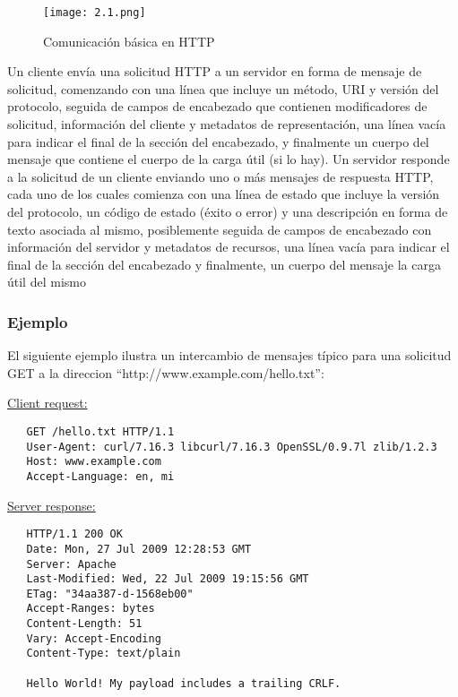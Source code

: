 \begin{center}
   \begin{figure}   
      \begin{center}
         \texttt{[image: 2.1.png]}
      \end{center}
      \caption{Comunicación básica en HTTP}
   \end{figure}
\end{center}

Un cliente envía una solicitud HTTP a un servidor en forma de mensaje
 de solicitud, comenzando con una línea que incluye un método, URI y 
 versión del protocolo, seguida de campos de encabezado que contienen
  modificadores de solicitud, información del cliente y metadatos de
   representación, una línea vacía para indicar el final de la sección
    del encabezado, y finalmente un cuerpo del mensaje que contiene el 
    cuerpo de la carga útil (si lo hay). Un servidor responde a la 
    solicitud de un cliente enviando uno o más mensajes de respuesta 
    HTTP, cada uno de los cuales comienza con una línea de estado que 
    incluye la versión del protocolo, un código de estado (éxito o error)
     y una descripción en forma de texto asociada al mismo, posiblemente 
     seguida de campos de encabezado con información del servidor y
      metadatos de recursos, una línea vacía para indicar el final 
      de la sección del encabezado y finalmente, un cuerpo del mensaje
       la carga útil del mismo

\subsubsection*{Ejemplo}
El siguiente ejemplo ilustra un intercambio de mensajes típico 
para una solicitud GET a la direccion “http://www.example.com/hello.txt”:

\bigskip
\noindent
\underline{Client request:}
\begin{verbatim}
   GET /hello.txt HTTP/1.1
   User-Agent: curl/7.16.3 libcurl/7.16.3 OpenSSL/0.9.7l zlib/1.2.3
   Host: www.example.com
   Accept-Language: en, mi
  \end{verbatim}
\underline{Server response:}
\begin{verbatim}
   HTTP/1.1 200 OK
   Date: Mon, 27 Jul 2009 12:28:53 GMT
   Server: Apache
   Last-Modified: Wed, 22 Jul 2009 19:15:56 GMT
   ETag: "34aa387-d-1568eb00"
   Accept-Ranges: bytes
   Content-Length: 51
   Vary: Accept-Encoding
   Content-Type: text/plain

   Hello World! My payload includes a trailing CRLF.
\end{verbatim}


